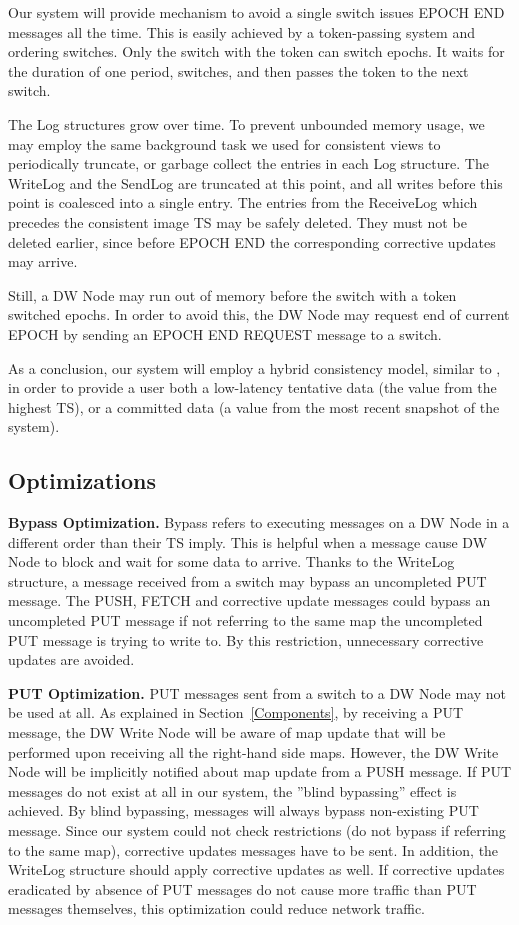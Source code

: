 \documentclass{sig-semester}
\begin{document}
Our system will provide mechanism to avoid a single switch issues EPOCH END messages all the time. This is easily achieved by a token-passing system and ordering switches. Only the switch with the token can switch epochs. It waits for the duration of one period, switches, and then passes the token to the next switch.

The Log structures grow over time. To prevent unbounded memory usage, we may employ the same background task we used for consistent views to periodically truncate, or garbage collect the entries in each Log structure. The WriteLog and the SendLog are truncated at this point, and all writes before this point is coalesced into a single entry. The entries from the ReceiveLog which precedes the consistent image TS may be safely deleted. They must not be deleted earlier, since before EPOCH END the corresponding corrective updates may arrive.

Still, a DW Node may run out of memory before the switch with a token switched epochs. In order to avoid this, the DW Node may request end of current EPOCH by sending an EPOCH END REQUEST message to a switch.

As a conclusion, our system will employ a hybrid consistency model, similar to \cite{Bayou95}, in order to provide a user both a low-latency tentative data (the value from the highest TS), or a committed data (a value from the most recent snapshot of the system).

\subsection{Optimizations}
\textbf{Bypass Optimization.} Bypass refers to executing messages on a DW Node in a different order than their TS imply. This is helpful when a message cause DW Node to block and wait for some data to arrive. Thanks to the WriteLog structure, a message received from a switch may bypass an uncompleted PUT message. The PUSH, FETCH and corrective update messages could bypass an uncompleted PUT message if not referring to the same map the uncompleted PUT message is trying to write to. By this restriction, unnecessary corrective updates are avoided.

\textbf{PUT Optimization.} PUT messages sent from a switch to a DW Node may not be used at all. As explained in Section~\ref{Components}, by receiving a PUT message, the DW Write Node will be aware of map update that will be performed upon receiving all the right-hand side maps. However, the DW Write Node will be implicitly notified about map update from a PUSH message. If PUT messages do not exist at all in our system, the ''blind bypassing'' effect is achieved. By blind bypassing, messages will always bypass non-existing PUT message. Since our system could not check restrictions (do not bypass if referring to the same map), corrective updates messages have to be sent. In addition, the WriteLog structure should apply corrective updates as well. If corrective updates eradicated by absence of PUT messages do not cause more traffic than PUT messages themselves, this optimization could reduce network traffic.
\end{document}
